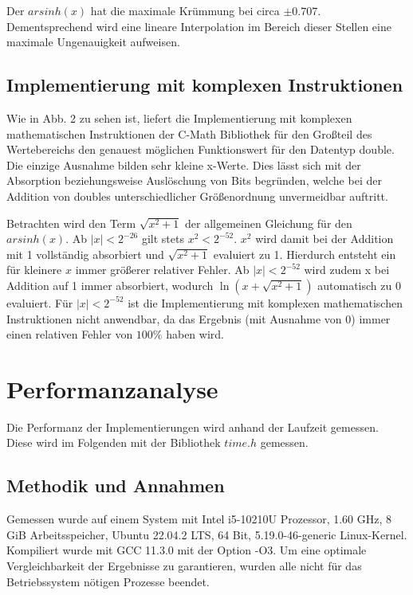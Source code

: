 \documentclass[course=erap] {aspdoc}
\begin{document}
    Der $arsinh(x)$ hat die maximale Krümmung bei circa $\pm 0.707$.
    Dementsprechend wird eine lineare Interpolation im Bereich dieser Stellen eine maximale Ungenauigkeit aufweisen.

    \subsection{Implementierung mit komplexen Instruktionen}\label{subsec:implementierung-mit-komplexen-instruktionen}

    Wie in Abb. 2 zu sehen ist, liefert die Implementierung mit komplexen mathematischen Instruktionen der C-Math Bibliothek für den Großteil des Wertebereichs den genauest möglichen Funktionswert für den Datentyp double.
    Die einzige Ausnahme bilden sehr kleine x-Werte.
    Dies lässt sich mit der Absorption beziehungsweise Auslöschung von Bits begründen, welche bei der Addition von doubles unterschiedlicher Größenordnung unvermeidbar auftritt.

    Betrachten wird den Term $\sqrt{x^2 + 1}$ der allgemeinen Gleichung für den $arsinh(x)$.
    Ab $|x|<2^{-26}$ gilt stets $x^2<2^{-52}$. $x^2$ wird damit bei der Addition mit 1 vollständig absorbiert und $\sqrt{x^2 + 1}$ evaluiert zu 1.
    Hierdurch entsteht ein für kleinere $x$ immer größerer relativer Fehler.
    Ab $|x|<2^{-52}$ wird zudem x bei Addition auf 1 immer absorbiert, wodurch $\ln{(x+\sqrt{x^2 + 1})}$ automatisch zu 0 evaluiert.
    Für $|x|<2^{-52}$ ist die Implementierung mit komplexen mathematischen Instruktionen nicht anwendbar, da das Ergebnis (mit Ausnahme von 0) immer einen relativen Fehler von $100\%$ haben wird.


    \section{Performanzanalyse}\label{sec:performanzanalyse}

    Die Performanz der Implementierungen wird anhand der Laufzeit gemessen.
    Diese wird im Folgenden mit der Bibliothek $time.h$ gemessen.

    \subsection{Methodik und Annahmen}\label{subsec:methodik-und-annahmen}

    Gemessen wurde auf einem System mit Intel i5-10210U Prozessor, 1.60 GHz, 8 GiB Arbeitsspeicher, Ubuntu 22.04.2 LTS, 64 Bit, 5.19.0-46-generic Linux-Kernel.
    Kompiliert wurde mit GCC 11.3.0 mit der Option -O3. Um eine optimale Vergleichbarkeit der Ergebnisse zu garantieren, wurden alle nicht für das Betriebssystem nötigen Prozesse beendet.
\end{document}
